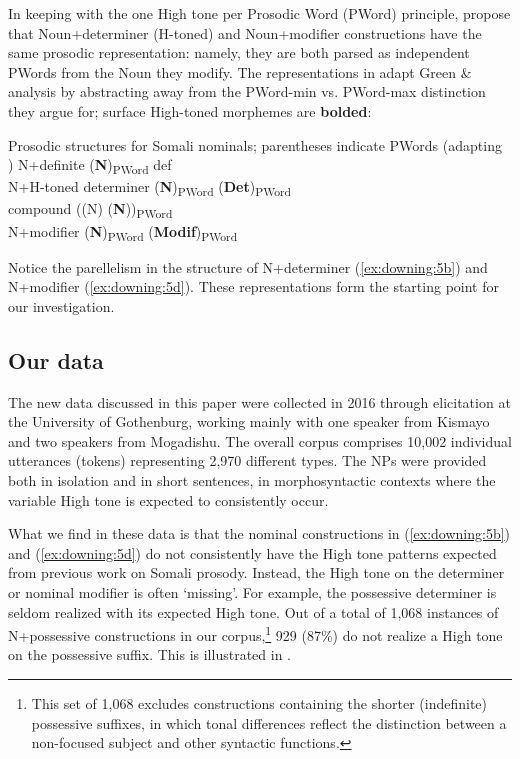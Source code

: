 \documentclass[output=paper]{langscibook}
\begin{document}
In keeping with the one High tone per Prosodic Word (PWord) principle, \citet{Green2016} propose that Noun+determiner (H-toned) and Noun+modifier constructions have the same prosodic representation: namely, they are both parsed as independent PWords from the Noun they modify. The representations in  adapt Green \&  analysis by abstracting away from the PWord-min vs. PWord-max distinction they argue for; surface High-toned morphemes are \textbf{bolded}:


\ea  Prosodic structures for Somali nominals; parentheses indicate PWords (adapting \citealt{Green2016})  \label{ex:downing:5}
\ea  N+definite  (\textbf{N})\textsubscript{PWord} def\label{ex:downing:5a}\\
\ex  N+H-toned determiner  (\textbf{N})\textsubscript{PWord} (\textbf{Det})\textsubscript{PWord}\label{ex:downing:5b}\\
\ex  compound  ((N) (\textbf{N}))\textsubscript{PWord}\label{ex:downing:5c}\\
\ex  N+modifier  (\textbf{N})\textsubscript{PWord} (\textbf{Modif})\textsubscript{PWord}\label{ex:downing:5d}\\
\z
\z

Notice the parellelism in the structure of N+determiner (\ref{ex:downing:5b}) and N+modifier (\ref{ex:downing:5d}). These representations form the starting point for our investigation.


\subsection{Our data}

The new data discussed in this paper were collected in 2016 through elicitation at the University of Gothenburg, working mainly with one speaker from Kismayo and two speakers from Mogadishu. The overall corpus comprises 10,002 individual utterances (tokens) representing 2,970 different types. The NPs were provided both in isolation and in short sentences, in morphosyntactic contexts where the variable High tone is expected to consistently occur.

What we find in these data is that the nominal constructions in (\ref{ex:downing:5b}) and (\ref{ex:downing:5d}) do not consistently have the High tone patterns expected from previous work on Somali prosody. Instead, the High tone on the determiner or nominal modifier is often ‘missing’. For example, the possessive determiner is seldom realized with its expected High tone. Out of a total of 1,068 instances of N+possessive constructions in our corpus,\footnote{This set of 1,068 excludes constructions containing the shorter (indefinite) possessive suffixes, in which tonal differences reflect the distinction between a non-focused subject and other syntactic functions.} 929 (87\%) do not realize a High tone on the possessive suffix. This is illustrated in . 
\end{document}
